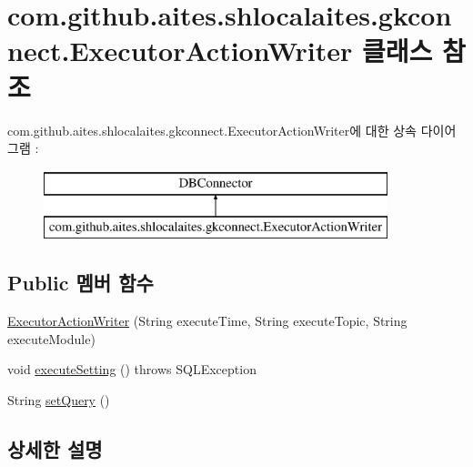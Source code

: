 \hypertarget{classcom_1_1github_1_1aites_1_1shlocalaites_1_1gkconnect_1_1_executor_action_writer}{}\section{com.\+github.\+aites.\+shlocalaites.\+gkconnect.\+Executor\+Action\+Writer 클래스 참조}
\label{classcom_1_1github_1_1aites_1_1shlocalaites_1_1gkconnect_1_1_executor_action_writer}
com.\+github.\+aites.\+shlocalaites.\+gkconnect.\+Executor\+Action\+Writer에 대한 상속 다이어그램 \+: \begin{figure}[H]
\begin{center}
\leavevmode
\includegraphics[height=2.000000cm]{classcom_1_1github_1_1aites_1_1shlocalaites_1_1gkconnect_1_1_executor_action_writer}
\end{center}
\end{figure}
\subsection*{Public 멤버 함수}
\begin{DoxyCompactItemize}
\item 
\mbox{\hyperlink{classcom_1_1github_1_1aites_1_1shlocalaites_1_1gkconnect_1_1_executor_action_writer_acc7d314a64a67fb1dfc97c5f56d3e699}{Executor\+Action\+Writer}} (String execute\+Time, String execute\+Topic, String execute\+Module)
\item 
void \mbox{\hyperlink{classcom_1_1github_1_1aites_1_1shlocalaites_1_1gkconnect_1_1_executor_action_writer_a1fe5de49a29fb1fbdf5e8e481f251b78}{execute\+Setting}} ()  throws S\+Q\+L\+Exception 
\item 
String \mbox{\hyperlink{classcom_1_1github_1_1aites_1_1shlocalaites_1_1gkconnect_1_1_executor_action_writer_a239e1a51ec536a1e361acebba74af952}{set\+Query}} ()
\end{DoxyCompactItemize}


\subsection{상세한 설명}


